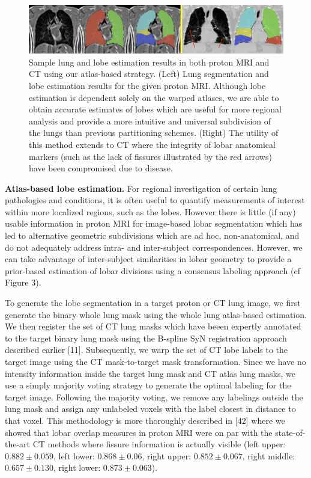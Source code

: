 \documentclass[11pt,]{article}
\begin{document}
\begin{figure}[htbp]
\centering
\includegraphics{Figs/lungEstimation.png}
\caption{Sample lung and lobe estimation results in both proton MRI and
CT using our atlas-based strategy. (Left) Lung segmentation and lobe
estimation results for the given proton MRI. Although lobe estimation is
dependent solely on the warped atlases, we are able to obtain accurate
estimates of lobes which are useful for more regional analysis and
provide a more intuitive and universal subdivision of the lungs than
previous partitioning schemes. (Right) The utility of this method
extends to CT where the integrity of lobar anatomical markers (such as
the lack of fissures illustrated by the red arrows) have been
compromised due to disease.}
\end{figure}

\textbf{Atlas-based lobe estimation.} For regional investigation of
certain lung pathologies and conditions, it is often useful to quantify
measurements of interest within more localized regions, such as the
lobes. However there is little (if any) usable information in proton MRI
for image-based lobar segmentation which has led to alternative
geometric subdivisions which are ad hoc, non-anatomical, and do not
adequately address intra- and inter-subject correspondences. However, we
can take advantage of inter-subject similarities in lobar geometry to
provide a prior-based estimation of lobar divisions using a consensus
labeling approach (cf Figure 3).

To generate the lobe segmentation in a target proton or CT lung image,
we first generate the binary whole lung mask using the whole lung
atlas-based estimation. We then register the set of CT lung masks which
have beeen expertly annotated to the target binary lung mask using the
B-spline SyN registration approach described earlier {[}11{]}.
Subsequently, we warp the set of CT lobe labels to the target image
using the CT mask-to-target mask transformation. Since we have no
intensity information inside the target lung mask and CT atlas lung
masks, we use a simply majority voting strategy to generate the optimal
labeling for the target image. Following the majority voting, we remove
any labelings outside the lung mask and assign any unlabeled voxels with
the label closest in distance to that voxel. This methodology is more
thoroughly described in {[}42{]} where we showed that lobar overlap
measures in proton MRI were on par with the state-of-the-art CT methods
where fissure information is actually visible (left upper:
$0.882 \pm 0.059$, left lower: $0.868 \pm 0.06$, right upper:
$0.852 \pm 0.067$, right middle: $0.657 \pm 0.130$, right lower:
$0.873 \pm 0.063$).
\end{document}
